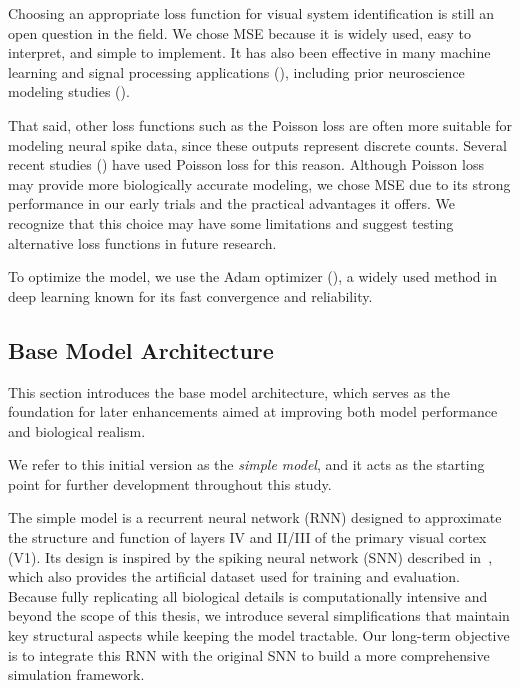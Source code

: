 Choosing an appropriate loss function for visual system identification is still an open question in the field. We chose MSE because it is widely used, easy to interpret, and simple to implement. It has also been effective in many machine learning and signal processing applications (\citet{wang2009mse, soderstrom2018errors}), including prior neuroscience modeling studies (\citet{antolik2016local}).

That said, other loss functions such as the Poisson loss are often more suitable for modeling neural spike data, since these outputs represent discrete counts. Several recent studies (\citet{terven2024lossfunctionsmetricsdeep, Wang2023towards, sinz2018stimulus}) have used Poisson loss for this reason. Although Poisson loss may provide more biologically accurate modeling, we chose MSE due to its strong performance in our early trials and the practical advantages it offers. We recognize that this choice may have some limitations and suggest testing alternative loss functions in future research.

To optimize the model, we use the Adam optimizer (\citet{kingma2017adammethodstochasticoptimization}), a widely used method in deep learning known for its fast convergence and reliability.

\subsection{Base Model Architecture}
\label{subsec:base_model_architecture}

This section introduces the base model architecture, which serves as the foundation for later enhancements aimed at improving both model performance and biological realism.

We refer to this initial version as the \emph{simple model}, and it acts as the starting point for further development throughout this study.

The simple model is a recurrent neural network (RNN) designed to approximate the structure and function of layers IV and II/III of the primary visual cortex (V1). Its design is inspired by the spiking neural network (SNN) described in~\citet{antolik2024comprehensive}, which also provides the artificial dataset used for training and evaluation. Because fully replicating all biological details is computationally intensive and beyond the scope of this thesis, we introduce several simplifications that maintain key structural aspects while keeping the model tractable. Our long-term objective is to integrate this RNN with the original SNN to build a more comprehensive simulation framework.

